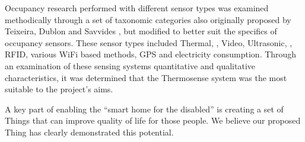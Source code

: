 \documentclass[../thesis/thesis.tex]{subfiles}
\begin{document}
Occupancy research performed with different sensor types was examined methodically through a set of taxonomic categories also originally proposed by Teixeira, Dublon and Savvides \cite{teixeira2010survey}, but modified to better suit the specifics of occupancy sensors. These sensor types included Thermal, \cdi, Video, Ultrasonic, \pir, RFID, various WiFi based methods, GPS and electricity consumption. Through an examination of these sensing systems quantitative and qualitative characteristics, it was determined that the Thermosense \iar system \cite{beltran2013thermosense} was the most suitable to the project's aims.

A key part of enabling the ``smart home for the disabled'' is creating a set of Things that can improve quality of life for those people. We believe our proposed Thing has clearly demonstrated this potential.

\end{document}
